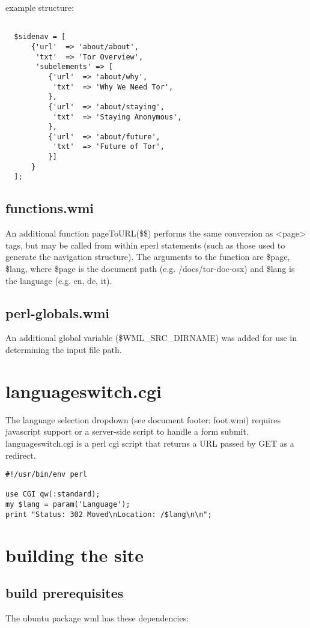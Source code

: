 \documentclass[11pt]{article}
\begin{document}
example structure:

\begin{verbatim}

  $sidenav = [
      {'url'  => 'about/about',
       'txt'  => 'Tor Overview',
       'subelements' => [
          {'url'  => 'about/why',
           'txt'  => 'Why We Need Tor',
          },
          {'url'  => 'about/staying',
           'txt'  => 'Staying Anonymous',
          },
          {'url'  => 'about/future',
           'txt'  => 'Future of Tor',
          }]
      }
  ];

\end{verbatim}

\subsection{functions.wmi}
An additional function pageToURL(\$\$) performs the same conversion as <page> tags, but may be called from within eperl statements (such as those used to generate the navigation structure). The arguments to the function are \$page, \$lang, where \$page is the document path (e.g. /docs/tor-doc-osx) and \$lang is the language (e.g. en, de, it).

\subsection{perl-globals.wmi}
An additional global variable (\$WML\_SRC\_DIRNAME) was added for use in determining the input file path.


\label{cgi-trampoline}
\section{languageswitch.cgi}
   The language selection dropdown (see document footer: foot.wmi) requires javascript support or a server-side script to handle a form submit. languageswitch.cgi is a perl cgi script that returns a URL passed by GET as a redirect.
\begin{verbatim}
#!/usr/bin/env perl

use CGI qw(:standard);
my $lang = param('Language');
print "Status: 302 Moved\nLocation: /$lang\n\n";
\end{verbatim}

\section{building the site}
\subsection{build prerequisites}
The ubuntu package wml has these dependencies:
\end{document}
